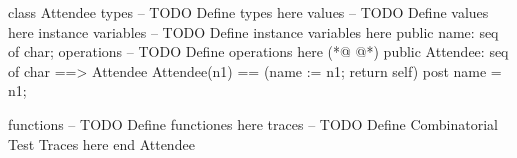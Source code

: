 \begin{vdmpp}[breaklines=true]
class Attendee
types
-- TODO Define types here
values
-- TODO Define values here
instance variables
-- TODO Define instance variables here
  public name: seq of char;
operations
-- TODO Define operations here
(*@
\label{Attendee:11}
@*)
  public Attendee: seq of char ==> Attendee
 Attendee(n1) == (name := n1; return self)
 post name = n1;
 
functions
-- TODO Define functiones here
traces
-- TODO Define Combinatorial Test Traces here
end Attendee
\end{vdmpp}
